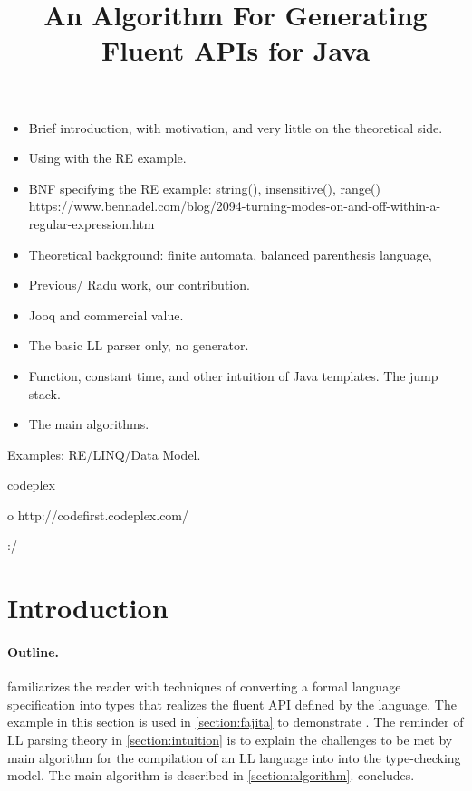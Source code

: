 \documentclass[nonatbib,preprint,numbers]{sigplanconf}
\title
{%
An Algorithm For Generating Fluent APIs for  Java 
}
\begin{document}
\maketitle
\begin{itemize}
    \item Brief introduction, with motivation, and very little on the theoretical side.
    \item Using \Fajita with the RE example.
    \item BNF specifying the RE example: string(), insensitive(), range()
      https://www.bennadel.com/blog/2094-turning-modes-on-and-off-within-a-regular-expression.htm
    \item Theoretical background: finite automata, balanced parenthesis language, 
    \item Previous/ Radu work, our contribution. 
    \item Jooq and commercial value.
    \item The basic LL parser only, no generator.
    \item Function, constant time, and other intuition of Java templates. The jump stack.
    \item The main algorithms.
\end{itemize}
Examples: RE/LINQ/Data Model.

codeplex

o http://codefirst.codeplex.com/

:/
\begin{abstract}

\end{abstract}

\section{Introduction}


\paragraph{Outline.}  familiarizes the reader with
techniques of converting a formal language specification into \Java types that
realizes the fluent API defined by the language. The example in this section is
used in \cref{section:fajita} to demonstrate \Fajita.  The reminder of LL
parsing theory in \cref{section:intuition} is to explain the challenges to be
met by main algorithm for the compilation of an LL language into into the \Java
type-checking model.  The main algorithm is described in
\cref{section:algorithm}.   concludes.
\end{document}
